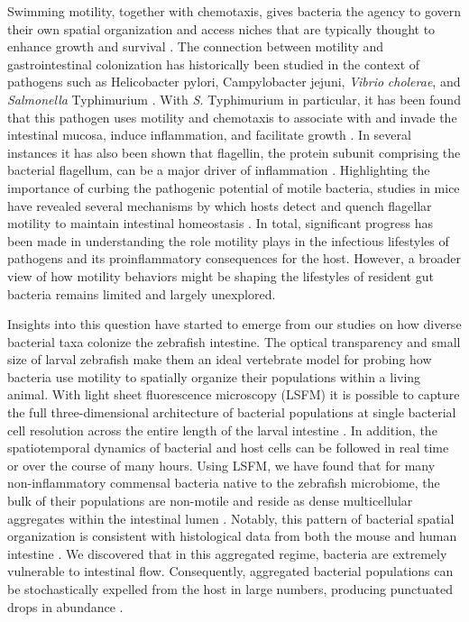 Swimming motility, together with chemotaxis, gives bacteria the agency to govern their own spatial organization and access niches that are typically thought to enhance growth and survival \cite{wei_population_2011,yawata_competition-dispersal_2014,raina_role_2019,stecher_motility_2008}. The connection between motility and gastrointestinal colonization has historically been studied in the context of pathogens such as Helicobacter pylori, Campylobacter jejuni, \textit{Vibrio} \textit{cholerae}, and \textit{Salmonella} Typhimurium \cite{ottemann_roles_1997}. With \textit{S. }Typhimurium in particular, it has been found that this pathogen uses motility and chemotaxis to associate with and invade the intestinal mucosa, induce inflammation, and facilitate growth \cite{stecher_motility_2008,rivera-chavez_energy_2016,stecher_flagella_2004}. In several instances it has also been shown that flagellin, the protein subunit comprising the bacterial flagellum, can be a major driver of inflammation \cite{ayres_lethal_2012,rui_reactogenicity_2010,zeng_flagellin_2003}. Highlighting the importance of curbing the pathogenic potential of motile bacteria, studies in mice have revealed several mechanisms by which hosts detect and quench flagellar motility to maintain intestinal homeostasis \cite{cullender_innate_2013,ayres_lethal_2012,fulde_neonatal_2018,okumura_lypd8_2016}. In total, significant progress has been made in understanding the role motility plays in the infectious lifestyles of pathogens and its proinflammatory consequences for the host. However, a broader view of how motility behaviors might be shaping the lifestyles of resident gut bacteria remains limited and largely unexplored.

Insights into this question have started to emerge from our studies on how diverse bacterial taxa colonize the zebrafish intestine. The optical transparency and small size of larval zebrafish make them an ideal vertebrate model for probing how bacteria use motility to spatially organize their populations within a living animal. With light sheet fluorescence microscopy (LSFM) it is possible to capture the full three-dimensional architecture of bacterial populations at single bacterial cell resolution across the entire length of the larval intestine \cite{parthasarathy_monitoring_2018}. In addition, the spatiotemporal dynamics of bacterial and host cells can be followed in real time or over the course of many hours. Using LSFM, we have found that for many non-inflammatory commensal bacteria native to the zebrafish microbiome, the bulk of their populations are non-motile and reside as dense multicellular aggregates within the intestinal lumen \cite{wiles_modernized_2018,schlomann_bacterial_2018}. Notably, this pattern of bacterial spatial organization is consistent with histological data from both the mouse and human intestine \cite{welch_spatial_2017,swidsinski_viscosity_2007,swidsinski_spatial_2005,van_der_waaij_vivo_1996}. We discovered that in this aggregated regime, bacteria are extremely vulnerable to intestinal flow. Consequently, aggregated bacterial populations can be stochastically expelled from the host in large numbers, producing punctuated drops in abundance \cite{wiles_host_2016,schlomann_sublethal_2019}. 

